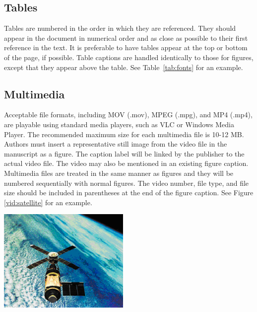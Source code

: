 \documentclass[12pt]{spieman}  %
\begin{document}
\begin{spacing}{2}
\subsection{Tables}
Tables are numbered in the order in which they are referenced. They should appear in the document in numerical order and as close as possible to their first reference in the text. It is preferable to have tables appear at the top or bottom of the page, if possible. Table captions are handled identically to those for figures, except that they appear above the table. See Table~\ref{tab:fonts} for an example.

\subsection{Multimedia}
Acceptable file formats, including MOV (.mov), MPEG (.mpg), and MP4 (.mp4), are playable using standard media players, such as VLC or Windows Media Player. The recommended maximum size for each multimedia file is 10-12 MB. Authors must insert a representative still image from the video file in the manuscript as a figure. The caption label will be linked by the publisher to the actual video file. The video may also be mentioned in an existing figure caption. Multimedia files are treated in the same manner as figures and they will be numbered sequentially with normal figures.  The video number, file type, and file size should be included in parentheses at the end of the figure caption. See Figure \ref{vid:satellite} for an example.

\begin{video}
\begin{center}
{\includegraphics[height=5cm]{satellite.eps}}
\\
\end{center}
\caption{\label{vid:satellite}This satellite is a still image from Video 1 (Video 1, MPEG, 2.5 MB).}
\end{video}

\appendix    %


\end{spacing}
\end{document}
